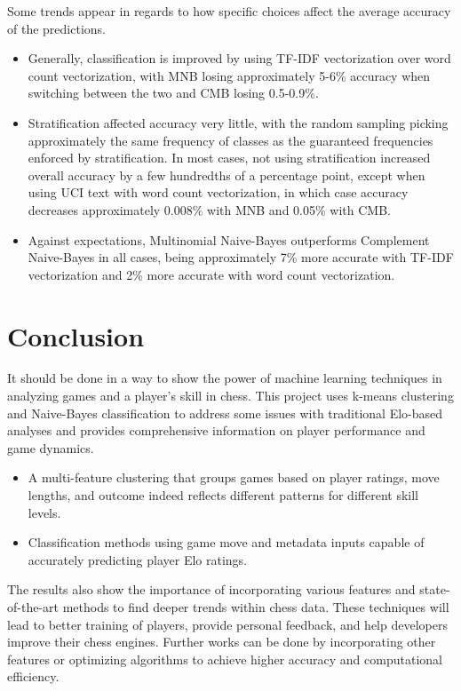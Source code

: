 \documentclass[conference]{IEEEtran}
\begin{document}
Some trends appear in regards to how specific choices affect the average accuracy of the predictions.
\begin{itemize}
\item Generally, classification is improved by using TF-IDF vectorization over word count vectorization, with MNB losing approximately 5-6\% accuracy when switching between the two and CMB losing 0.5-0.9\%.
\item Stratification affected accuracy very little, with the random sampling picking approximately the same frequency of classes as the guaranteed frequencies enforced by stratification. In most cases, not using stratification increased overall accuracy by a few hundredths of a percentage point, except when using UCI text with word count vectorization, in which case accuracy decreases approximately 0.008\% with MNB and 0.05\% with CMB.
\item Against expectations, Multinomial Naive-Bayes outperforms Complement Naive-Bayes in all cases, being approximately 7\% more accurate with TF-IDF vectorization and 2\% more accurate with word count vectorization.
\end{itemize}

\section{Conclusion}

It should be done in a way to show the power of machine learning techniques in analyzing games and a player's skill in chess. This project uses k-means clustering and Naive-Bayes classification to address some issues with traditional Elo-based analyses and provides comprehensive information on player performance and game dynamics.

\begin{itemize}
    \item  A multi-feature clustering that groups games based on player ratings, move lengths, and outcome indeed reflects different patterns for different skill levels.
    \item Classification methods using game move and metadata inputs capable of accurately predicting player Elo ratings.
\end{itemize}

The results also show the importance of incorporating various features and state-of-the-art methods to find deeper trends within chess data. These techniques will lead to better training of players, provide personal feedback, and help developers improve their chess engines. Further works can be done by incorporating other features or optimizing algorithms to achieve higher accuracy and computational efficiency.
\end{document}
